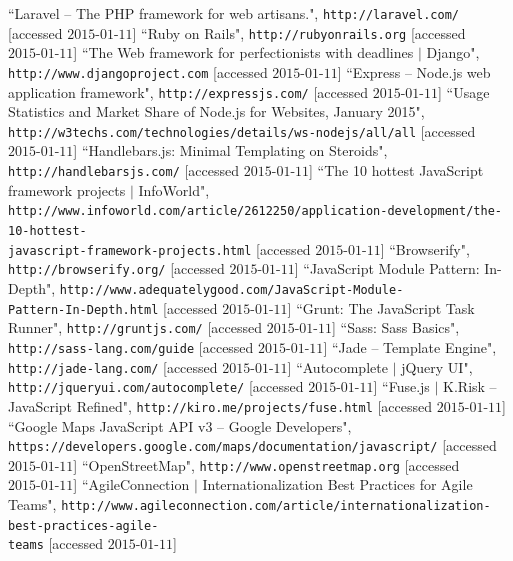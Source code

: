 \documentclass[a4paper, 10pt]{report}
\begin{document}
\begin{appendices}
\begin{thebibliography}{99}
``Laravel -- The PHP framework for web artisans.", 
\texttt{http://laravel.com/} [accessed $\text{2015-01-11}$]
``Ruby on Rails", \texttt{http://rubyonrails.org} [accessed $\text{2015-01-11}$]
 ``The Web framework for perfectionists with deadlines $|$ Django", \texttt{http://www.djangoproject.com} [accessed $\text{2015-01-11}$]
``Express -- Node.js web application framework", \texttt{http://expressjs.com/} [accessed $\text{2015-01-11}$]
``Usage Statistics and Market Share of Node.js for Websites, January 2015", \texttt{http://w3techs.com/technologies/details/ws-nodejs/all/all} [accessed $\text{2015-01-11}$]
``Handlebars.js: Minimal Templating on Steroids", \texttt{http://handlebarsjs.com/} [accessed $\text{2015-01-11}$]
``The 10 hottest JavaScript framework projects $|$ InfoWorld",\\ \texttt{http://www.infoworld.com/article/2612250/application-development/the-10-hottest-\\javascript-framework-projects.html} [accessed $\text{2015-01-11}$]
``Browserify", \texttt{http://browserify.org/} [accessed $\text{2015-01-11}$]
``JavaScript Module Pattern: In-Depth", \texttt{http://www.adequatelygood.com/JavaScript-Module-\\Pattern-In-Depth.html} [accessed $\text{2015-01-11}$]
``Grunt: The JavaScript Task Runner",
\texttt{http://gruntjs.com/} [accessed $\text{2015-01-11}$]
``Sass: Sass Basics", \texttt{http://sass-lang.com/guide} [accessed $\text{2015-01-11}$]
``Jade -- Template Engine", \texttt{http://jade-lang.com/} [accessed $\text{2015-01-11}$]
``Autocomplete $|$ jQuery UI", \texttt{http://jqueryui.com/autocomplete/} [accessed $\text{2015-01-11}$]
``Fuse.js $|$ K.Risk -- JavaScript Refined", \texttt{http://kiro.me/projects/fuse.html} [accessed $\text{2015-01-11}$]
``Google Maps JavaScript API v3 -- Google Developers",\\ \texttt{https://developers.google.com/maps/documentation/javascript/}
[accessed $\text{2015-01-11}$]
``OpenStreetMap", \texttt{http://www.openstreetmap.org} [accessed $\text{2015-01-11}$]
``AgileConnection $|$ Internationalization Best Practices for Agile Teams", \texttt{http://www.agileconnection.com/article/internationalization-best-practices-agile-\\teams} [accessed $\text{2015-01-11}$]


\end{thebibliography}
\end{appendices}
\end{document}
